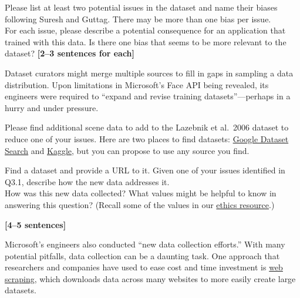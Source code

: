 \documentclass{csci1430}
\begin{document}
\pagebreak
\begin{subquestion}[points=4]
Please list at least two potential issues in the dataset and name their biases following Suresh and Guttag. There may be more than one bias per issue. \\

For each issue, please describe a potential consequence for an application that trained with this data. Is there one bias that seems to be more relevant to the dataset? \textbf{[2--3 sentences for each]}
\end{subquestion}

\begin{answer}[height=20]

\end{answer}

\pagebreak
Dataset curators might merge multiple sources to fill in gaps in sampling a data distribution. Upon limitations in Microsoft's Face API being revealed, its engineers were required to ``expand and revise training datasets''---perhaps in a hurry and under pressure. 

Please find additional scene data to add to the Lazebnik et al.~2006 dataset to reduce one of your issues. Here are two places to find datasets: \href{https://datasetsearch.research.google.com}{Google Dataset Search} and \href{https://www.kaggle.com}{Kaggle}, but you can propose to use any source you find.

\begin{subquestion}[points=4]
Find a dataset and provide a URL to it. Given one of your issues identified in Q3.1, describe how the new data addresses it. \\

How was this new data collected?
What values might be helpful to know in answering this question?
(Recall some of the values in our \href{https://browncsci1430.github.io/resources/ethics_primer/}{ethics resource}.)

\textbf{[4--5 sentences]}
\end{subquestion}

\begin{answer}[height=20]

\end{answer}

\pagebreak
Microsoft's engineers also conducted ``new data collection efforts.'' With many potential pitfalls, data collection can be a daunting task.
One approach that researchers and companies have used to ease cost and time investment is 
\href{https://en.wikipedia.org/wiki/Web_scraping#}{web scraping}, which downloads data across many websites to more easily create large datasets. 
\end{document}
